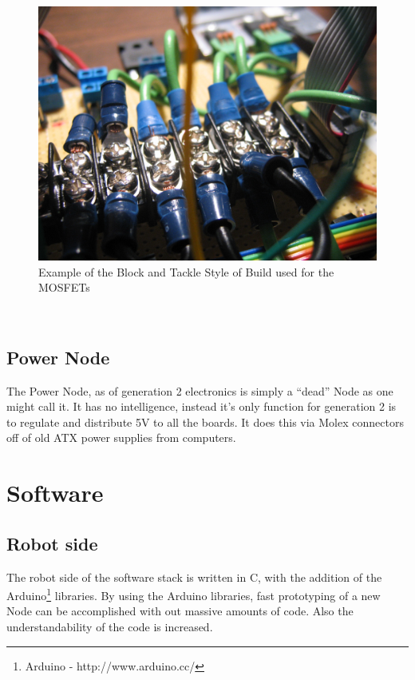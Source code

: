 \documentclass{article}
\begin{document}
\begin{figure}[htp]
  \begin{center}
\includegraphics[scale=0.05]{blockandtackle}
  \end{center}
  \caption{Example of the Block and Tackle Style of Build used for the MOSFETs}
\label{blockandtackle}
\end{figure}\\
\subsection{Power Node}
The Power Node, as of generation 2 electronics is simply a “dead” Node as one might call it. It has no intelligence, instead it's only function for generation 2 is to regulate and distribute 5V to all the boards. It does this via Molex connectors off of old ATX power supplies from computers.\\
\section{Software}
\subsection{Robot side}
The robot side of the software stack is written in C, with the addition of the Arduino\footnote{Arduino - http://www.arduino.cc/} libraries. By using the Arduino libraries, fast prototyping of a new Node can be accomplished with out massive amounts of code. Also the understandability of the code is increased.\\
\end{document}
